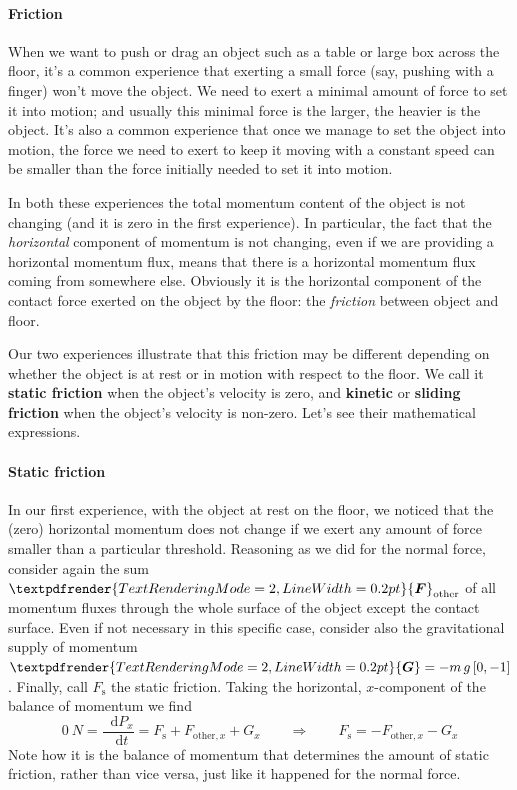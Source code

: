 \documentclass[a4paper,12pt,%
onecolumn,oneside,%
british%
]{memoir}
\renewcommand*{\bm}[1]{\textpdfrender{TextRenderingMode=2,LineWidth=0.2pt}{\boldsymbol{#1}}}
\newcommand*{\di}{\mathop{}\!\mathrm{d}}%
\renewcommand*{\|}[1][]{\nonscript\:#1\vert\nonscript\:\mathopen{}}
\newcommand*{\dt}{\di t}
\newcommand*{\ym}{m}%
\newcommand*{\yF}{\bm{F}}
\newcommand*{\yFs}{F_{\textrm{s}}}
\newcommand*{\yFr}{\yF_{\textrm{other}}}
\newcommand*{\yFrx}{F_{\textrm{other},x}}
\newcommand*{\yG}{\bm{G}}
\begin{document}
\paragraph{Friction}

When we want to push or drag an object such as a table or large box across the floor, it's a common experience that exerting a small force (say, pushing with a finger) won't move the object. We need to exert a minimal amount of force to set it into motion; and usually this minimal force is the larger, the heavier is the object. It's also a common experience that once we manage to set the object into motion, the force we need to exert to keep it moving with a constant speed can be smaller than the force initially needed to set it into motion.

In both these experiences the total momentum content of the object is not changing (and it is zero in the first experience). In particular, the fact that the \emph{horizontal} component of momentum is not changing, even if we are providing a horizontal momentum flux, means that there is a horizontal momentum flux coming from somewhere else. Obviously it is the horizontal component of the contact force exerted on the object by the floor: the \emph{friction} between object and floor.

Our two experiences illustrate that this friction may be different depending on whether the object is at rest or in motion with respect to the floor. We call it \textbf{static friction} when the object's velocity is zero, and \textbf{kinetic} or \textbf{sliding friction} when the object's velocity is non-zero. Let's see their mathematical expressions.

\paragraph{Static friction}

In our first experience, with the object at rest on the floor, we noticed that the (zero) horizontal momentum does not change if we exert any amount of force smaller than a particular threshold. Reasoning as we did for the normal force, consider again the sum $\yFr$ of all momentum fluxes through the whole surface of the object except the contact surface. Even if not necessary in this specific case, consider also the gravitational supply of momentum $\yG=-\ym\,g\,[0,-1]$. Finally, call $\yFs$ the static friction. Taking the horizontal, $x$-component of the balance of momentum we find
\begin{equation*}
  \qty{0}{N} =
  \frac{\di P_{x}}{\dt}
  = \yFs + \yFrx + G_{x}
\qquad  \Longrightarrow\qquad
  \yFs = - \yFrx - G_{x}
\end{equation*}
Note how it is the balance of momentum that determines the amount of static friction, rather than vice versa, just like it happened for the normal force.
\end{document}
